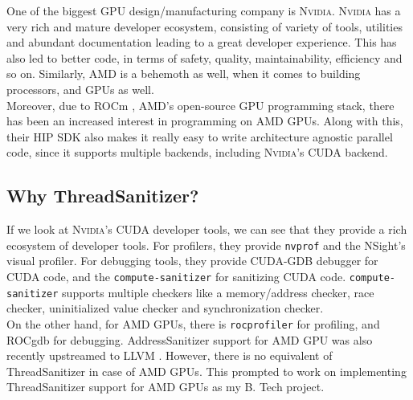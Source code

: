 \documentclass{btp}
\begin{document}
One of the biggest GPU design/manufacturing company is \textsc{Nvidia}. \textsc{Nvidia} has a very rich and mature developer ecosystem, consisting of variety of tools, utilities and abundant documentation leading to a great developer experience. This has also led to better code, in terms of safety, quality, maintainability, efficiency and so on. Similarly, AMD is a behemoth as well, when it comes to building processors, and GPUs as well.
\\
\newline
Moreover, due to ROCm \cite{rocm}, AMD's open-source GPU programming stack, there has been an increased interest in programming on AMD GPUs. Along with this, their HIP \cite{hip} SDK also makes it really easy to write architecture agnostic parallel code, since it supports multiple backends, including \textsc{Nvidia}'s CUDA \cite{cuda} backend.

\subsection{Why ThreadSanitizer?}

If we look at \textsc{Nvidia}'s CUDA developer tools, we can see that they provide a rich ecosystem of developer tools. For profilers, they provide \texttt{nvprof} and the NSight's visual profiler\cite{nvprof}. For debugging tools, they provide CUDA-GDB \cite{cudagdb} debugger for CUDA code, and the \texttt{compute-sanitizer} \cite{compsan} for sanitizing CUDA code. \texttt{compute-sanitizer} supports multiple checkers like a memory/address checker, race checker, uninitialized value checker and synchronization checker.
\\
\newline
On the other hand, for AMD GPUs, there is \texttt{rocprofiler} \cite{rocprofiler} for profiling, and ROCgdb \cite{rocgdb} for debugging. AddressSanitizer support \cite{asan-amdgpu} for AMD GPU was also recently upstreamed to LLVM \cite{asan-patch-amd}. However, there is no equivalent of ThreadSanitizer in case of AMD GPUs. This prompted to work on implementing ThreadSanitizer support for AMD GPUs as my B. Tech project.
\end{document}
